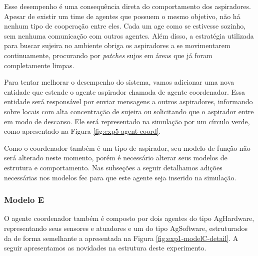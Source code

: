 Esse desempenho é uma consequência direta do comportamento dos aspiradores. Apesar de existir um time de agentes que possuem o mesmo objetivo, não há nenhum tipo de cooperação entre eles. Cada um age como se estivesse sozinho, sem nenhuma comunicação com outros agentes. Além disso, a estratégia utilizada para buscar sujeira no ambiente obriga os aspiradores a se movimentarem continuamente, procurando por \textit{patches} sujos em áreas que já foram completamente limpas. 

Para tentar melhorar o desempenho do sistema, vamos adicionar uma nova entidade que estende o agente aspirador chamada de agente coordenador. Essa entidade será responsável por enviar mensagens a outros aspiradores, informando sobre locais com alta concentração de sujeira ou solicitando que o aspirador entre em modo de descanso.  Ele será representado na simulação por um círculo verde, como apresentado na Figura \ref{fig:exp5-agent-coord}.

\begin{figure}[h!]
    \centering
\end{figure}

Como o coordenador também é um tipo de aspirador, seu modelo de função não será alterado neste momento, porém é necessário alterar seus modelos de estrutura e comportamento. Nas subseções a seguir detalhamos adições necessárias nos modelos \acrshort{fec} para que este agente seja inserido na simulação.  

\subsubsection{Modelo E}

O agente coordenador também é composto por dois agentes do tipo AgHardware, representando seus sensores e atuadores e um do tipo AgSoftware, estruturados da de forma semelhante a apresentada na Figura \ref{fig:exp1-modelC-detail}. A seguir apresentamos as novidades na estrutura deste experimento. 

